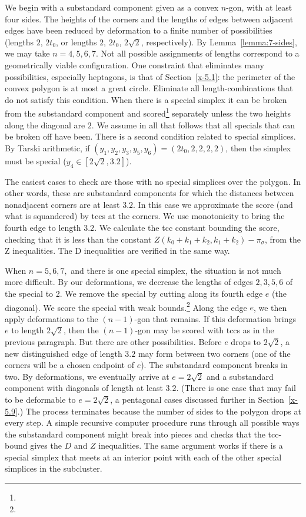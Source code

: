 We begin with a substandard component given as a convex $n$-gon, with at least
four sides.   The heights of the corners and the lengths of edges
between adjacent edges have been reduced by deformation to a finite
number of possibilities (lengths $2$, $2t_0$, or lengths $2$,
$2t_0$, $2\sqrt{2}$, respectively). By Lemma~\ref{lemma:7-sides}, we
may take $n=4,5,6,7$. Not all possible assignments of lengths
correspond to a geometrically viable configuration. One constraint
that eliminates many possibilities, especially heptagons, is that of
Section~\ref{x-5.1}: the perimeter of the convex polygon is at most
a great circle.  Eliminate all length-combinations that do not
satisfy this condition.  When there is a special simplex it can be
broken
from the substandard component and scored\footnote{} %
separately unless the two heights along the diagonal are $2$.
We assume in all that follows that all specials that can be
broken off have been. There is a second condition related to special
simplices.  By Tarski arithmetic, if
$(y_1,y_2,y_3,y_5,y_6)= (2t_0,2,2,2,2)$, then
the simplex must be special
($y_4\in[2\sqrt{2},3.2]$).


The easiest cases to check are those with no special simplices over the
polygon.  In other words, these are substandard components for which the distances
between nonadjacent corners are at least $3.2$.  In this case we
approximate the score (and what is squandered) by tccs at the corners.
We use monotonicity to bring the fourth edge to length $3.2$. We
calculate the tcc constant bounding the score, checking that it is less
than the constant
    $ Z(k_0+k_1+k_2,k_1+k_2) - \pi_\sigma$,
from the Z inequalities. The D inequalities  are verified in the same
way.

When $n=5,6,7,$ and there is one special simplex, the situation is not
much more difficult.  By our deformations,  we decrease the lengths of
edges $2,3,5,6$ of the special to 2. We remove the special by cutting
along its fourth edge $e$ (the diagonal).  We score the special with
weak bounds.\footnote{} %
Along the edge $e$, we then apply deformations to the $(n-1)$-gon
that remains. If this deformation brings $e$ to length
$2\sqrt{2}$, then the $(n-1)$-gon may be scored with tccs as in
the previous paragraph.  But there are other possibilities. Before
$e$ drops to $2\sqrt{2}$, a new distinguished edge of length $3.2$
may form between two corners (one of the corners will be a chosen
endpoint of $e$).  The substandard component breaks in two. By deformations,
we eventually arrive at $e=2\sqrt2$ and a substandard component with diagonals
of length at least $3.2$.  (There is one case that may fail to be
deformable to $e=2\sqrt2$, a pentagonal cases discussed further in
Section~\ref{x-5.9}.) The process terminates because the number of
sides to the polygon drops at every step. A simple recursive
computer procedure runs through all possible ways the substandard component
might break into pieces and checks that the tcc-bound gives the
$D$ and $Z$ inequalities. The same argument works if there is a
special simplex that meets at an interior point with each of the
other special simplices in the subcluster.

